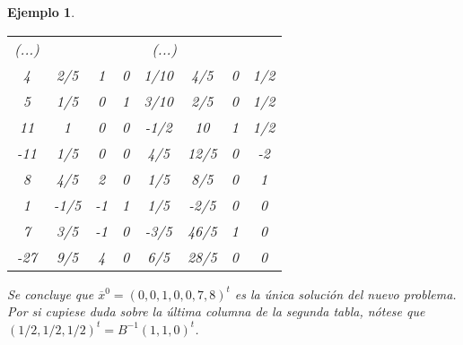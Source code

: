 \documentclass[11pt]{report}
\theoremstyle{mytheorem}
\theoremstyle{mydefinition}
\theoremstyle{myexample}
\newtheorem*{example}{Ejemplo}
\begin{document}
\begin{example}
\begin{center}
\begin{tabular}{|c|c|c|c|c|c|c|c|}
    \multicolumn{1}{|c|}{\phantom{-}(...)} & \multicolumn{7}{c|}{(...)} \\ \hhline{|=|=|=|=|=|=|=|=|}
    
    \phantom{-}4 & \multicolumn{1}{c}{\phantom{-}2/5} & \multicolumn{1}{c}{\phantom{-}1} & \multicolumn{1}{c}{\phantom{-}0} & \multicolumn{1}{c}{\phantom{-}1/10}& \multicolumn{1}{c}{\phantom{-}4/5} & \multicolumn{1}{c}{0} & \multicolumn{1}{c|}{\phantom{-}1/2} \\

    \phantom{-}5 & \multicolumn{1}{c}{\phantom{-}1/5} & \multicolumn{1}{c}{\phantom{-}0} & \multicolumn{1}{c}{\phantom{-}1} & \multicolumn{1}{c}{\phantom{-}3/10}& \multicolumn{1}{c}{\phantom{-}2/5} & \multicolumn{1}{c}{0} & \multicolumn{1}{c|}{\phantom{-}1/2} \\
    
    \phantom{-}11 & \multicolumn{1}{c}{\phantom{-}1} & \multicolumn{1}{c}{\phantom{-}0} & \multicolumn{1}{c}{\phantom{-}0} & \multicolumn{1}{c}{-1/2}& \multicolumn{1}{c}{\phantom{-}10} & \multicolumn{1}{c}{1} & \multicolumn{1}{c|}{\phantom{-}1/2} \\ \cline{1-8}
    
    -11 & \multicolumn{1}{c}{\phantom{-}1/5} & \multicolumn{1}{c}{\phantom{-}0} & \multicolumn{1}{c}{\phantom{-}0} & \multicolumn{1}{c}{\phantom{-}4/5} & \multicolumn{1}{c}{\phantom{-}12/5} & \multicolumn{1}{c}{0} & \multicolumn{1}{c|}{-2} \\ \hhline{|=|=|=|=|=|=|=|=|}
    
    \phantom{-}8 & \multicolumn{1}{c}{\phantom{-}4/5} & \multicolumn{1}{c}{\phantom{-}2} & \multicolumn{1}{c}{\phantom{-}0} & \multicolumn{1}{c}{\phantom{-}1/5}& \multicolumn{1}{c}{\phantom{-}8/5} & \multicolumn{1}{c}{0} & \multicolumn{1}{c|}{\phantom{-}1} \\

    \phantom{-}1 & \multicolumn{1}{c}{-1/5} & \multicolumn{1}{c}{-1} & \multicolumn{1}{c}{\phantom{-}1} & \multicolumn{1}{c}{\phantom{-}1/5}& \multicolumn{1}{c}{-2/5} & \multicolumn{1}{c}{0} & \multicolumn{1}{c|}{\phantom{-}0} \\
    
    \phantom{-}7 & \multicolumn{1}{c}{\phantom{-}3/5} & \multicolumn{1}{c}{-1} & \multicolumn{1}{c}{\phantom{-}0} & \multicolumn{1}{c}{-3/5}& \multicolumn{1}{c}{\phantom{-}46/5} & \multicolumn{1}{c}{1} & \multicolumn{1}{c|}{\phantom{-}0} \\ \cline{1-8}
    
    -27 & \multicolumn{1}{c}{\phantom{-}9/5} & \multicolumn{1}{c}{\phantom{-}4} & \multicolumn{1}{c}{\phantom{-}0} & \multicolumn{1}{c}{\phantom{-}6/5} & \multicolumn{1}{c}{\phantom{-}28/5} & \multicolumn{1}{c}{0} & \multicolumn{1}{c|}{0} \\ \cline{1-8}
\end{tabular}
\end{center}
Se concluye que $\overline{x}^0 = (0,0,1,0,0,7,8)^t$ es la única solución del nuevo problema. Por si cupiese duda sobre la última columna de la segunda tabla, nótese que $(1/2,1/2,1/2)^t = B^{-1}(1,1,0)^t$.

\end{example}
\end{document}
